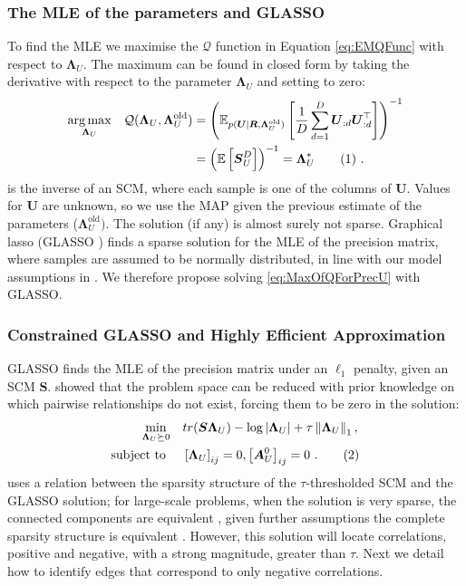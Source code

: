\documentclass{article}
\theoremstyle{plain}
\theoremstyle{definition}
\theoremstyle{remark}
\newcommand\numberthis{\addtocounter{equation}{1}\tag{\theequation}}
\def\*#1{\boldsymbol{#1}}
\begin{document}
\subsubsection{The MLE of the parameters and GLASSO} To find the MLE we maximise the $\mathcal{Q}$ function in Equation \eqref{eq:EMQFunc} with respect to $\*\Lambda_U$. The maximum can be found in closed form by taking the derivative with respect to the parameter $\*\Lambda_U$ and setting to zero:
\begin{align*}
\underset{\*\Lambda_U}{\arg\max} \quad \mathcal{Q}(\*\Lambda_U, \*\Lambda_U^{\text{old}}) &= \left(\mathbb{E}_{p(\*U | \*R, \*\Lambda_U^{\text{old}})} \left[ \frac{1}{D} \sum_{d=1}^{D}  \*U_{:d} \*U_{:d}^\top \right] \right)^{-1} \\
&= \left(\mathbb{E} \left[ \*S_U^D \right] \right)^{-1} =  \*\Lambda_U^*  \numberthis  \ . \label{eq:MaxOfQForPrecU}
\end{align*}
 is the inverse of an SCM, where each sample is one of the columns of $\*U$. Values for $\*U$ are unknown, so we use the MAP given the previous estimate of the parameters ($\*\Lambda_U^{\text{old}})$.  The solution (if any) is almost surely not sparse. Graphical lasso (GLASSO \cite{mazumder2012graphical}) finds a sparse solution for the MLE of the precision matrix, where samples are assumed to be normally distributed, in line with our model assumptions in . We therefore propose solving \eqref{eq:MaxOfQForPrecU} with GLASSO. 

\subsubsection{Constrained GLASSO and Highly Efficient Approximation} GLASSO finds the MLE of the precision matrix under an $\ell_1$ penalty, given an SCM $\*S$. \citet{grechkin2015pathway} showed that the problem space can be reduced with prior knowledge on which pairwise relationships do not exist, forcing them to be zero in the solution:
\begin{align*}
    \underset{\*\Lambda_U \succeq 0 }{\min}& \quad tr(\*S \*\Lambda_U  ) - \log | \*\Lambda_U | + \tau \left\lVert \*\Lambda_U \right\rVert_1 , \\  
    \text{subject to } & \quad \left[\*\Lambda_U\right]_{ij} = 0, \left[\*A^0_U\right]_{ij} = 0 \ . \numberthis \label{eq:ConstrainedGLASSO}
\end{align*}
\citet{zhang2018largescaleprec} uses a relation between the sparsity structure of the $\tau$-thresholded SCM and the GLASSO solution;  for large-scale problems, when the solution is very sparse, the connected components are equivalent \cite{mazumder2012graphical}, given further assumptions the complete sparsity structure is equivalent \cite{fattahi2019graphical,sojoudi2016equivalence,sojoudi2016graphical}. 
However, this solution will locate correlations, positive and negative, with a strong magnitude, greater than $\tau$. Next we detail how to identify edges that correspond to only negative correlations.
\end{document}

